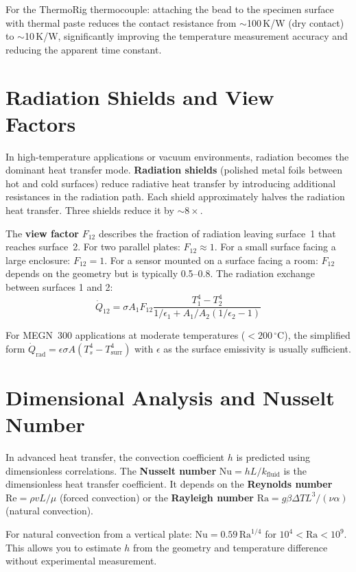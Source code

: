 \documentclass[11pt,letterpaper,twoside,openany]{book}
\newcommand{\degC}{\ensuremath{{}^{\circ}\text{C}}}
\begin{document}
For the ThermoRig thermocouple: attaching the bead to the specimen surface with thermal paste reduces the contact resistance from $\sim$100\,K/W (dry contact) to $\sim$10\,K/W, significantly improving the temperature measurement accuracy and reducing the apparent time constant.

\section{Radiation Shields and View Factors}
In high-temperature applications or vacuum environments, radiation becomes the dominant heat transfer mode. \textbf{Radiation shields} (polished metal foils between hot and cold surfaces) reduce radiative heat transfer by introducing additional resistances in the radiation path. Each shield approximately halves the radiation heat transfer. Three shields reduce it by $\sim$$8\times$.

The \textbf{view factor} $F_{12}$ describes the fraction of radiation leaving surface~1 that reaches surface~2. For two parallel plates: $F_{12} \approx 1$. For a small surface facing a large enclosure: $F_{12} = 1$. For a sensor mounted on a surface facing a room: $F_{12}$ depends on the geometry but is typically 0.5--0.8. The radiation exchange between surfaces 1 and 2:
\begin{equation}
\dot{Q}_{12} = \sigma A_1 F_{12} \frac{T_1^4 - T_2^4}{1/\epsilon_1 + A_1/A_2(1/\epsilon_2 - 1)}
\end{equation}

For MEGN~300 applications at moderate temperatures ($< 200$\,\degC{}), the simplified form $\dot{Q}_{\text{rad}} = \epsilon\sigma A(T_s^4 - T_{\text{surr}}^4)$ with $\epsilon$ as the surface emissivity is usually sufficient.

\section{Dimensional Analysis and Nusselt Number}
In advanced heat transfer, the convection coefficient $h$ is predicted using dimensionless correlations. The \textbf{Nusselt number} $\text{Nu} = hL/k_{\text{fluid}}$ is the dimensionless heat transfer coefficient. It depends on the \textbf{Reynolds number} $\text{Re} = \rho v L / \mu$ (forced convection) or the \textbf{Rayleigh number} $\text{Ra} = g\beta\Delta T L^3/(\nu\alpha)$ (natural convection).

For natural convection from a vertical plate: $\text{Nu} = 0.59 \, \text{Ra}^{1/4}$ for $10^4 < \text{Ra} < 10^9$. This allows you to estimate $h$ from the geometry and temperature difference without experimental measurement.
\end{document}
